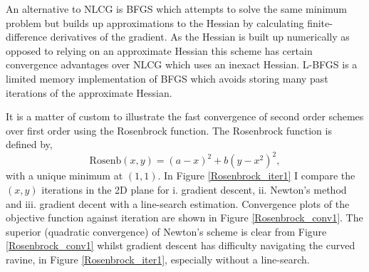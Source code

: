 \documentclass[11pt,twocolumn]{article}
\begin{document}
An alternative to NLCG is BFGS which attempts to solve the same minimum problem but builds up approximations to the Hessian by calculating finite-difference derivatives of the gradient. As the Hessian is built up numerically as opposed to relying on an approximate Hessian this scheme has certain convergence advantages over NLCG which uses an inexact Hessian. L-BFGS is a limited memory implementation of BFGS which avoids storing many past iterations of the approximate Hessian.

It is a matter of custom to illustrate the fast convergence of second order schemes over first order using the Rosenbrock function. The Rosenbrock function is defined by,
\begin{equation}
\textrm{Rosenb}(x,y)=(a-x)^2+b(y-x^2)^2,\label{rosen_defn}
\end{equation}
with a unique minimum at $(1,1)$. In Figure \ref{Rosenbrock_iter1} I compare the $(x,y)$ iterations in the 2D plane for  i. gradient descent, ii. Newton's method and iii. gradient decent with a line-search estimation.  Convergence plots of the objective function against iteration are shown in Figure \ref{Rosenbrock_conv1}. The superior (quadratic convergence) of Newton's scheme is clear from Figure \ref{Rosenbrock_conv1} whilst gradient descent has difficulty navigating the curved ravine, in Figure \ref{Rosenbrock_iter1}, especially without a line-search. 
\end{document}
